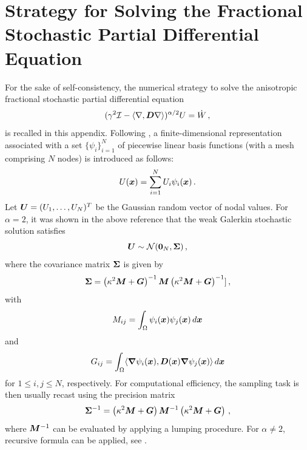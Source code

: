 \section{Strategy for Solving the Fractional Stochastic Partial Differential Equation}\label{sec:solver-SPDE}
For the sake of self-consistency, the numerical strategy to solve the anisotropic fractional stochastic partial differential equation
\begin{equation}
    (\gamma^2 \mathcal{I} -\langle \nabla, \boldsymbol{D}\nabla\rangle)^{\alpha/2} U = \dot{W}\,,
    \label{eq:spdeH-app}
\end{equation}
is recalled in this appendix. Following \cite{Lindgren2011}, a finite-dimensional representation associated with a set $\{\psi_i\}_{i=1}^{N}$ of piecewise linear basis functions (with a mesh comprising $N$ nodes) is introduced as follows:
\begin{equation}
U(\boldsymbol{x}) = \sum_{i=1}^{N} U_i \psi_i(\boldsymbol{x})\,.
\end{equation}
Let $\boldsymbol{U} = (U_1, \ldots, U_N)^T$ be the Gaussian random vector of nodal values. For $\alpha = 2$, it was shown in the above reference that the weak Galerkin stochastic solution satisfies
\begin{equation}
    \boldsymbol{U} \sim \mathcal{N}(\boldsymbol{0}_N, \boldsymbol{\Sigma})\,,
\end{equation}
where the covariance matrix $\boldsymbol{\Sigma}$ is given by 
\begin{equation}
    \boldsymbol{\Sigma} = \left(\kappa^2 \boldsymbol{M} + \boldsymbol{G}\right)^{-1} \boldsymbol{M} \left(\kappa^2 \boldsymbol{M} + \boldsymbol{G}\right)^{-1}]\,,
\end{equation} 
with
\begin{equation}
M_{ij} = \int_{\Omega} \psi_i(\boldsymbol{x})\psi_j(\boldsymbol{x})\,d\boldsymbol{x}
\label{eq:M}
\end{equation}
and
\begin{equation}
G_{ij} = \int_{\Omega} \langle \boldsymbol{\nabla}\psi_i(\boldsymbol{x}), \boldsymbol{D}(\boldsymbol{x})\boldsymbol{\nabla}\psi_j(\boldsymbol{x})\rangle \, d\boldsymbol{x}
\end{equation}
for $1 \leqslant i,j \leqslant N$, respectively. For computational efficiency, the sampling task is then usually recast using the precision matrix 
\begin{equation}
    \boldsymbol{\Sigma}^{-1} = \left(\kappa^2 \boldsymbol{M} + \boldsymbol{G}\right) \boldsymbol{M}^{-1} \left(\kappa^2 \boldsymbol{M} + \boldsymbol{G}\right)\,,
\end{equation}
where $\boldsymbol{M}^{-1}$ can be evaluated by applying a lumping procedure. For $\alpha \neq 2$, recursive formula can be applied, see \cite{Lindgren2011}.

